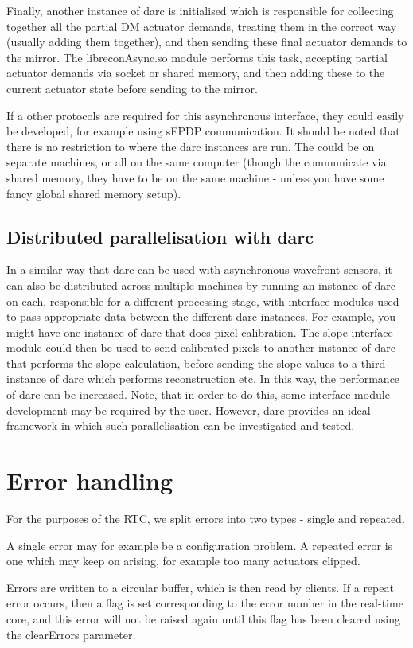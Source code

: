 \documentclass[a4,10pt]{article}
\begin{document}
Finally, another instance of darc is initialised which is responsible
for collecting together all the partial DM actuator demands, treating
them in the correct way (usually adding them together), and then
sending these final actuator demands to the mirror.  The
libreconAsync.so module performs this task, accepting partial actuator
demands via socket or shared memory, and then adding these to the
current actuator state before sending to the mirror.

If a other protocols are required for this asynchronous
interface, they could easily be developed, for example using sFPDP
communication.  It should be noted that there is no
restriction to where the darc instances are run.  The could be on
separate machines, or all on the same computer (though the communicate
via shared memory, they have to be on the same machine - unless you
have some fancy global shared memory setup).


\subsection{Distributed parallelisation with darc}
In a similar way that darc can be used with asynchronous wavefront
sensors, it can also be distributed across multiple machines by
running an instance of darc on each, responsible for a different
processing stage, with interface modules used to pass appropriate data
between the different darc instances.  For example, you might have one
instance of darc that does pixel calibration.  The slope interface
module could then be used to send calibrated pixels to another
instance of darc that performs the slope calculation, before sending
the slope values to a third instance of darc which performs
reconstruction etc.  In this way, the performance of darc can be
increased.  Note, that in order to do this, some interface module
development may be required by the user.  However, darc provides an
ideal framework in which such parallelisation can be investigated and
tested.


\section{Error handling}
For the purposes of the RTC, we split errors into two types - single
and repeated.  

A single error may for example be a configuration problem.  A repeated
error is one which may keep on arising, for example too many actuators
clipped.  

Errors are written to a circular buffer, which is then read by
clients.  If a repeat error occurs, then a flag is set corresponding
to the error number in the real-time core, and this error will not be
raised again until this flag has been cleared using the clearErrors
parameter.  
\end{document}
